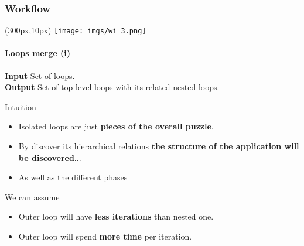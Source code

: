 \documentclass{beamer}
\begin{document}
\begin{frame}
\frametitle{Workflow}
\begin{textblock*}{5cm}(300px,10px) %
	\texttt{[image: imgs/wi\_3.png]}
\end{textblock*}
\framesubtitle{Loops merge (i)}
\begin{mdframed}[backgroundcolor=black!10,roundcorner=5pt,linewidth=0pt]
\textbf{Input} Set of loops.\\
\textbf{Output} Set of top level loops with its related nested loops.
\end{mdframed}
\vspace{10px}
\pause
\vfill
Intuition
\begin{itemize}
	\item Isolated loops are just \textbf{pieces of the overall puzzle}.
	\item By discover its hierarchical relations \textbf{the structure of the application will be discovered}...
	\item As well as the different phases
\end{itemize}
\pause
We can assume
\begin{itemize}
	\item Outer loop will have \textbf{less iterations} than nested one.
	\item Outer loop will spend \textbf{more time} per iteration.
\end{itemize}
\end{frame}
\end{document}
